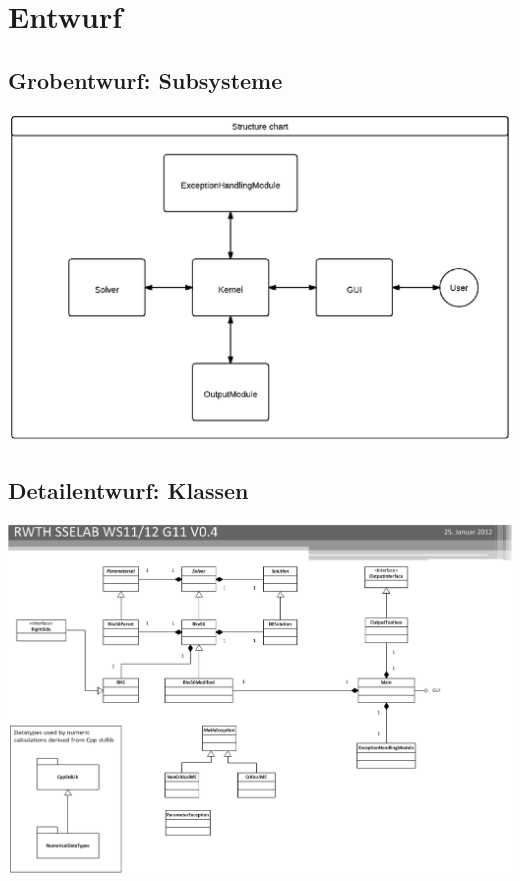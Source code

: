 \chapter{Entwurf}
\label{ch:3}

\section{Grobentwurf: Subsysteme}
\label{sec:3.1}
\includegraphics[width=6in,keepaspectratio=true]{figures/StructureDiagGyroSim.eps}



\section{Detailentwurf: Klassen}
\label{sec:3.2}
\includegraphics[width=6in,keepaspectratio=true]{figures/RWTH_SSELAB_WS1112_CLASSES.eps}

